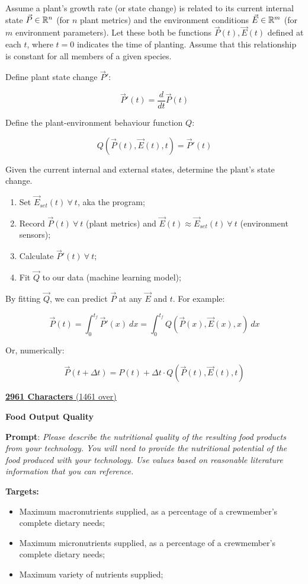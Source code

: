 \documentclass{report}
\begin{document}
Assume a plant's growth rate (or state change) is related to its current internal state $\vec P \in \mathbb R^n$ (for $n$ plant metrics) and the environment conditions $\vec E \in \mathbb R^m$ (for $m$ environment parameters). Let these both be functions $\vec P (t),\vec E(t)$ defined at each $t$, where $t=0$ indicates the time of planting. Assume that this relationship is constant for all members of a given species.

Define plant state change $\vec P'$: 

$$\vec P'(t) = \frac{d}{dt}\vec P(t)$$

Define the plant-environment behaviour function $Q$: 

$$Q(\vec P(t), \vec E(t), t)=\vec P'(t)$$ 

Given the current internal and external states, determine the plant's state change.

\begin{enumerate}
    \item Set $\vec E_{set}(t)~\forall~ t$, aka the program;
    \item Record $\vec P(t)~\forall~ t$ (plant metrics) and $\vec E(t)\approx \vec E_{set}(t)~\forall~ t$ (environment sensors);
    \item Calculate $\vec P'(t)~\forall~ t$;
    \item Fit $\vec Q$ to our data (machine learning model);
\end{enumerate}

By fitting $\vec Q$, we can predict $\vec P$ at any $\vec E$ and $t$. For example:

$$\vec P(t)=\int_0^{t_f}\vec P'(x)~dx=\int_0^{t_f}Q(\vec P(x),\vec E(x),x)~dx$$

Or, numerically:

$$\vec P(t+\Delta t)=P(t)+\Delta t\cdot Q(\vec P(t),\vec E(t),t)$$

\uline{\textbf{2961 Characters} (1461 over)}

\textbf{Food Output Quality}
\label{sec:resource-outputquality}

\textbf{Prompt}: \textit{Please describe  the nutritional quality of the resulting food products from your technology. You will need to provide the nutritional potential of the food produced with your technology. Use values based on reasonable literature information that you can reference.}

\textbf{Targets:}
\begin{itemize}
    \item Maximum macronutrients supplied, as a percentage of a crewmember’s complete dietary needs;
    \item Maximum micronutrients supplied, as a percentage of a crewmember’s complete dietary needs;
    \item Maximum variety of nutrients supplied;
\end{itemize}
\end{document}
